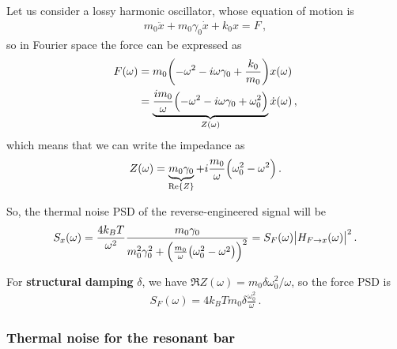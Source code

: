 \documentclass[main.tex]{subfiles}
\begin{document}


Let us consider a lossy harmonic oscillator, whose equation of motion is 
%
\begin{align}
m_0 \ddot{x} + m_0 \gamma_0 \dot{x} + k_0 x = F
\,,
\end{align}
%
so in Fourier space the force can be expressed as 
%
\begin{align}
F(\omega ) &= m_0 \qty(-\omega^2 - i \omega \gamma_0 + \frac{k_0}{m_0 }) x(\omega )  \\
&= \underbrace{\frac{i m_0 }{\omega} \qty(-\omega^2 - i \omega \gamma_0 + \omega_0^2)}_{Z(\omega )}
\dot{x}(\omega )
\,,
\end{align}
%
which means that we can write the impedance as 
%
\begin{align}
Z(\omega ) = \underbrace{m_0 \gamma_0}_{\Re{Z}} + i \frac{m_0}{\omega } \qty(\omega_0^2 - \omega^2)
\,.
\end{align}
%

So, the thermal noise PSD of the reverse-engineered signal will be  
%
\begin{align}
S_x (\omega ) = \frac{4 k_B T}{\omega^2}
\frac{m_0 \gamma_0 }{m_0^2 \gamma_0^2 + 
\qty( \frac{m_0}{\omega } \qty(\omega_0^2 - \omega^2))^2}
= S_F (\omega ) \abs{H_{F \to x} (\omega )}^2
\,.
\end{align}

For \textbf{structural damping} \(\delta \), we have \(\Re{Z(\omega )} = m_0 \delta \omega_0^2/ \omega \), so the force PSD is 
%
\begin{align}
S_F (\omega ) =4 k_B T m_0 \delta \frac{\omega_0^2}{\omega }
\,.
\end{align}

\subsubsection{Thermal noise for the resonant bar}
\end{document}
